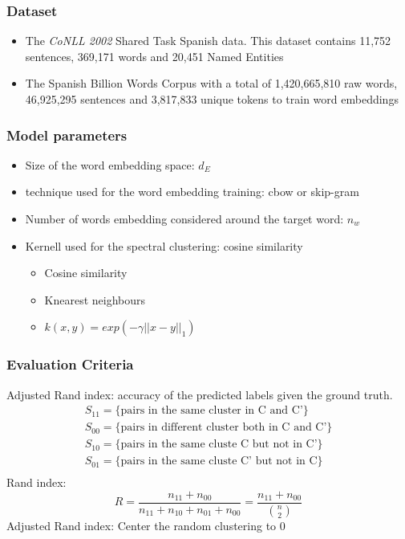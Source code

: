 \documentclass{beamer}
\begin{document}
\begin{frame}
	\frametitle{Dataset}
	\begin{itemize} 
    \item The \emph{CoNLL 2002} Shared Task Spanish data. This dataset contains 11,752 sentences, 369,171 words and 20,451 Named Entities
    \end{itemize} 

\begin{itemize} 
	\item The Spanish Billion Words Corpus  with a total of 1,420,665,810 raw words,  46,925,295 sentences and 3,817,833 unique tokens to train word embeddings
\end{itemize} 
\end{frame}

\begin{frame}
\frametitle{Model parameters}
\begin{itemize} 
\item Size of the word  embedding space: $d_E$
\item technique used for the word embedding training: cbow  or skip-gram
\item Number of words embedding considered around the target word: $n_w$
\item Kernell used for the spectral clustering: cosine similarity 
\begin{itemize}
\item Cosine similarity 
\item Knearest neighbours 
\item $k(x,y)=exp(-\gamma ||x-y||_1)$
\end{itemize} 
\end{itemize}  
\end{frame}

\begin{frame}
\frametitle{Evaluation Criteria}
Adjusted Rand index: accuracy of the predicted labels given the ground truth.
$$
\begin{array}{ll}
S_{11} = \{\text{pairs in the same cluster in C and C'} \}\\
S_{00} =  \{\text{pairs in different cluster both in C and C'} \}\\
S_{10} =  \{\text{pairs in the same cluste C but not in C'} \}\\
S_{01} =  \{\text{pairs in the same cluste C' but not in C}  \}\\
\end{array}
$$
Rand index:
$$
R=\frac{n_{11}+n_{00}}{n_{11}+n_{10}+n_{01}+n_{00}} = \frac{n_{11}+n_{00}}{{ n\choose 2}}
$$
Adjusted Rand index: Center the random clustering to 0
\end{frame}
\end{document}

